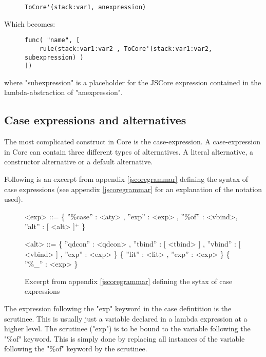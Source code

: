 \begin{figure}[H]
\lstset{ %
language=Haskell,
caption=Lambda abstraction in Core' format,
label=lst:int1
}
\begin{lstlisting}
ToCore'(stack:var1, anexpression)
\end{lstlisting}
\end{figure}

Which becomes:

\begin{figure}[H]
\lstset{ %
language=Haskell,
caption=Lambda abstraction in Core' format,
label=lst:int1
}
\begin{lstlisting}
func( "name", [
    rule(stack:var1:var2 , ToCore'(stack:var1:var2, subexpression) )
])
\end{lstlisting}
\end{figure}

where "subexpression" is a placeholder for the JSCore expression contained in the 
lambda-abstraction of "anexpression".


\subsection{Case expressions and alternatives}

The most complicated construct in Core is the case-expression. A case-expression
in Core can contain three different types of alternatives. A literal alternative,
a constructor alternative or a default alternative. 

Following is an excerpt from appendix \ref{jscoregrammar} defining the syntax 
of case expressions (see appendix \ref{jscoregrammar} for an explanation of the
notation used).

\begin{figure}[H]
\scriptsize
\begin{grammar}

<exp>		  ::= 	 \{ ''\%case'' : <aty> , ''exp'' : <exp> , ''\%of'' : <vbind>, ''alt'' : [ <alt> ]$^{+}$ \}	

<alt>		  ::= 	 \{ ''qdcon'' : <qdcon> , ''tbind'' : [ <tbind> ] , ''vbind'' : [ <vbind> ] , ''exp'' : <exp> \}
		  \alt 			 \{ ''lit'' : <lit> , ''exp'' : <exp> \}
		  \alt 			 \{ ''\%\_'' : <exp> \}	
\end{grammar}

\label{caseexpr}
\caption{Excerpt from appendix \ref{jscoregrammar} defining the sytax of case expressions}
\end{figure}

The expression following the "exp" keyword in the case defintition is the scrutinee. This
is usually just a variable declared in a lambda expression at a higher level.
The scrutinee ("exp") is to be bound to the variable following the "\%of" keyword.
This is simply done by replacing all instances of the variable following the "\%of" keyword
by the scrutinee.


